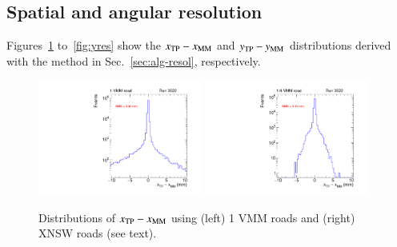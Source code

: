\subsection{Spatial and angular resolution}
\label{sec:perf-res}
Figures~\ref{fig:xres} to~\ref{fig:yres} show the  $x_{\rm TP}-x_{\rm MM}$ and $y_{\rm TP}-y_{\rm MM}$  distributions
derived with the method in Sec.~\ref{sec:alg-resol}, respectively.
\begin{figure}[!htpb]
  \begin{center}
    \includegraphics[width=0.48\textwidth]{figures/gbtanalysis3522/TP_xres_full.pdf}
    \includegraphics[width=0.48\textwidth]{figures/gbtanalysis3522/TP_xres.pdf}
  \end{center}
  \vspace{-10pt}
  \caption{Distributions of $x_{\rm TP}-x_{\rm MM}$  using (left) 1 VMM roads and (right) XNSW
 roads (see text).}
  \label{fig:xres}
\end{figure}
